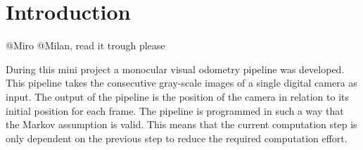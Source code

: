 \section{Introduction}
\textcolor[rgb]{1,0,0}{@Miro @Milan, read it trough please}

During this mini project a monocular visual odometry pipeline was developed. This pipeline takes the consecutive gray-scale images of a single digital camera as input. 
The output of the pipeline is the position of the camera in relation to its initial position for each frame.
The pipeline is programmed in such a way that the Markov assumption is valid. This means that the current computation step is only dependent on the previous step to reduce the required computation effort.